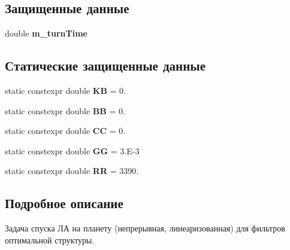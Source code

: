 \subsection*{Защищенные данные}
\begin{DoxyCompactItemize}
\item 
\hypertarget{class_tasks_1_1_continuous_1_1_landing_linear_a79bc6b7e7f836080684aa36e4f6cec5f}{}\label{class_tasks_1_1_continuous_1_1_landing_linear_a79bc6b7e7f836080684aa36e4f6cec5f} 
double {\bfseries m\+\_\+turn\+Time}
\end{DoxyCompactItemize}
\subsection*{Статические защищенные данные}
\begin{DoxyCompactItemize}
\item 
\hypertarget{class_tasks_1_1_continuous_1_1_landing_linear_a429e2f85bd502a35b59f84021f63e456}{}\label{class_tasks_1_1_continuous_1_1_landing_linear_a429e2f85bd502a35b59f84021f63e456} 
static constexpr double {\bfseries KB} = 0.
\item 
\hypertarget{class_tasks_1_1_continuous_1_1_landing_linear_a9327ad0f9f6f06ce3278722f42d4cc42}{}\label{class_tasks_1_1_continuous_1_1_landing_linear_a9327ad0f9f6f06ce3278722f42d4cc42} 
static constexpr double {\bfseries BB} = 0.
\item 
\hypertarget{class_tasks_1_1_continuous_1_1_landing_linear_ab539ba664a08722ed6c9a855be340567}{}\label{class_tasks_1_1_continuous_1_1_landing_linear_ab539ba664a08722ed6c9a855be340567} 
static constexpr double {\bfseries CC} = 0.
\item 
\hypertarget{class_tasks_1_1_continuous_1_1_landing_linear_a9a79b7472c9e491554ca0f76b76106e0}{}\label{class_tasks_1_1_continuous_1_1_landing_linear_a9a79b7472c9e491554ca0f76b76106e0} 
static constexpr double {\bfseries GG} = 3.\+E-\/3
\item 
\hypertarget{class_tasks_1_1_continuous_1_1_landing_linear_ae35b8a06f6479415f11e967602fbf0d6}{}\label{class_tasks_1_1_continuous_1_1_landing_linear_ae35b8a06f6479415f11e967602fbf0d6} 
static constexpr double {\bfseries RR} = 3390.
\end{DoxyCompactItemize}


\subsection{Подробное описание}
Задача спуска ЛА на планету (непрерывная, линеаризованная) для фильтров оптимальной структуры. 

